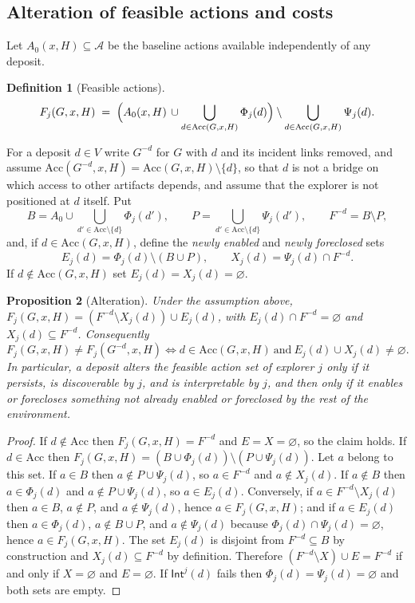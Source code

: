 \documentclass[11pt]{article}
\newtheorem{proposition}{Proposition}[section]
\theoremstyle{definition}
\newtheorem{definition}[proposition]{Definition}
\theoremstyle{remark}
\newcommand{\Acc}{\mathrm{Acc}}
\newcommand{\Int}{\mathsf{Int}}
\begin{document}
\subsection{Alteration of feasible actions and costs}

Let $A_0(x,H)\subseteq\mathcal{A}$ be the baseline actions available independently of any deposit.

\begin{definition}[Feasible actions]\label{def:feasible}
$$F_j(G,x,H)\;=\;\Bigl(A_0(x,H)\,\cup\bigcup_{d\in\Acc(G,x,H)}\Phi_j(d)\Bigr)\setminus\bigcup_{d\in\Acc(G,x,H)}\Psi_j(d).$$
\end{definition}

For a deposit $d\in V$ write $G^{-d}$ for $G$ with $d$ and its incident links removed, and assume $\Acc(G^{-d},x,H)=\Acc(G,x,H)\setminus\{d\}$, so that $d$ is not a bridge on which access to other artifacts depends, and assume that the explorer is not positioned at $d$ itself. Put
$$B=A_0\cup\bigcup_{d'\in\Acc\setminus\{d\}}\Phi_j(d'),\qquad P=\bigcup_{d'\in\Acc\setminus\{d\}}\Psi_j(d'),\qquad F^{-d}=B\setminus P,$$
and, if $d\in\Acc(G,x,H)$, define the \emph{newly enabled} and \emph{newly foreclosed} sets
$$E_j(d)=\Phi_j(d)\setminus(B\cup P),\qquad X_j(d)=\Psi_j(d)\cap F^{-d}.$$
If $d\notin\Acc(G,x,H)$ set $E_j(d)=X_j(d)=\varnothing$.

\begin{proposition}[Alteration]\label{prop:alter}
Under the assumption above, $F_j(G,x,H)=(F^{-d}\setminus X_j(d))\cup E_j(d)$, with $E_j(d)\cap F^{-d}=\varnothing$ and $X_j(d)\subseteq F^{-d}$. Consequently
$$F_j(G,x,H)\neq F_j(G^{-d},x,H)\iff d\in\Acc(G,x,H)\ \text{and}\ E_j(d)\cup X_j(d)\neq\varnothing.$$
In particular, a deposit alters the feasible action set of explorer $j$ only if it persists, is discoverable by $j$, and is interpretable by $j$, and then only if it enables or forecloses something not already enabled or foreclosed by the rest of the environment.
\end{proposition}
\begin{proof}
If $d\notin\Acc$ then $F_j(G,x,H)=F^{-d}$ and $E=X=\varnothing$, so the claim holds. If $d\in\Acc$ then $F_j(G,x,H)=(B\cup\Phi_j(d))\setminus(P\cup\Psi_j(d))$. Let $a$ belong to this set. If $a\in B$ then $a\notin P\cup\Psi_j(d)$, so $a\in F^{-d}$ and $a\notin X_j(d)$. If $a\notin B$ then $a\in\Phi_j(d)$ and $a\notin P\cup\Psi_j(d)$, so $a\in E_j(d)$. Conversely, if $a\in F^{-d}\setminus X_j(d)$ then $a\in B$, $a\notin P$, and $a\notin\Psi_j(d)$, hence $a\in F_j(G,x,H)$; and if $a\in E_j(d)$ then $a\in\Phi_j(d)$, $a\notin B\cup P$, and $a\notin\Psi_j(d)$ because $\Phi_j(d)\cap\Psi_j(d)=\varnothing$, hence $a\in F_j(G,x,H)$. The set $E_j(d)$ is disjoint from $F^{-d}\subseteq B$ by construction and $X_j(d)\subseteq F^{-d}$ by definition. Therefore $(F^{-d}\setminus X)\cup E=F^{-d}$ if and only if $X=\varnothing$ and $E=\varnothing$. If $\Int^j(d)$ fails then $\Phi_j(d)=\Psi_j(d)=\varnothing$ and both sets are empty.
\end{proof}
\end{document}
